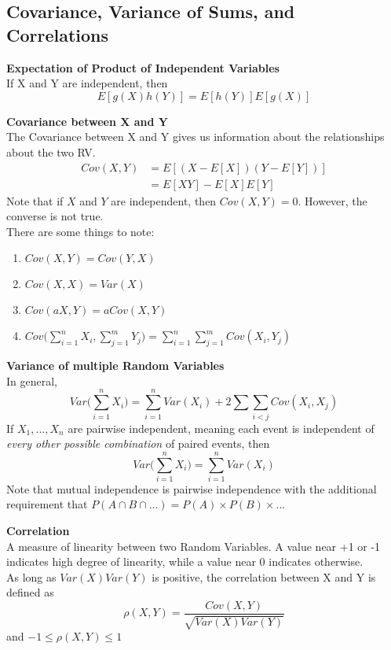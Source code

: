 \documentclass[10pt,a4paper]{article}
\begin{document}
    \subsection{Covariance, Variance of Sums, and Correlations}
    \begin{framed}
    	\centering\textbf{Expectation of Product of Independent Variables} \\
    	If X and Y are independent, then
    	    $$E[g(X)h(Y)] = E[h(Y)]E[g(X)]$$
    \end{framed}
    \begin{framed}
    	\centering\textbf{Covariance between X and Y} \\
    	The Covariance between X and Y gives us information about the relationships about the two RV. 
    	\begin{align*}
    	Cov(X,Y) &= E[(X - E[X])(Y - E[Y])] \\
    	              &= E[XY] - E[X]E[Y]
    	\end{align*}
    	Note that if $X$ and $Y$ are independent, then $Cov(X,Y) = 0$. However, the converse is not true.\\
    	There are some things to note:
    	\begin{enumerate}
    	 \item $Cov(X,Y) = Cov(Y,X)$
    	 \item $Cov(X,X) = Var(X)$
    	 \item $Cov(aX,Y) = aCov(X,Y)$
    	 \item $Cov\bigg(\sum^{n}_{i=1}X_{i}, \sum^{m}_{j=1}Y_{j}\bigg) = \sum_{i=1}^{n}\sum_{j=1}^{m}Cov(X_{i}, Y_{j})$
    	 \end{enumerate} 
    \end{framed}
    \begin{framed}
    	\centering\textbf{Variance of multiple Random Variables} \\
    	In general,
    	 $$Var\bigg(\sum_{i=1}^{n}X_{i}\bigg) = \sum_{i=1}^{n}Var(X_{i}) + 2 \sum\sum_{i<j}Cov(X_{i},X_{j})$$
    	 If $X_{1},...,X_{n}$ are pairwise independent, meaning each event is independent of \emph{every other possible combination} of paired events, then $$Var\bigg(\sum_{i=1}^{n}X_{i}\bigg) = \sum_{i=1}^{n}Var(X_{i})$$
    	 Note that mutual independence is pairwise independence with the additional requirement that $P(A \cap B \cap ...) = P(A) \times P(B) \times ...$
    \end{framed}
    \newpage 
    \begin{framed}
    	\centering\textbf{Correlation} \\
    	A measure of linearity between two Random Variables. A value near +1 or -1 indicates high degree of linearity, while a value near 0 indicates otherwise.\\
    	As long as $Var(X)Var(Y)$ is positive, the correlation between X and Y is defined as $$\rho(X,Y) = \frac{Cov(X,Y)}{\sqrt{Var(X) Var(Y)}}$$ and $-1 \leq  \rho(X,Y) \leq 1$
    \end{framed}
\end{document}
